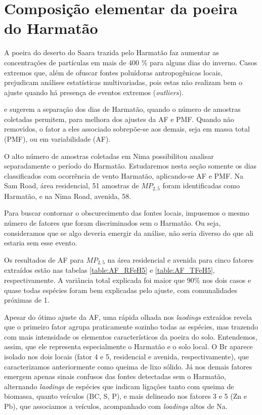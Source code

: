 \newpage
\section{Composição elementar da poeira do Harmatão}

A poeira do deserto do Saara trazida pelo Harmatão faz aumentar as concentrações
de partículas em mais de 400 \% para alguns dias do inverno. Casos extremos 
que, além de ofuscar fontes poluídoras antropogênicas locais, prejudicam 
análises estatísticas multivariadas, pois estas não realizam bem o ajuste 
quando há presença de eventos extremos (\textit{outliers}).

\citet{aboh2009} e \citet{ofosu2013} sugerem a separação dos dias de Harmatão, 
quando o número de amostras coletadas permitem, para melhora dos ajustes da AF e PMF. 
Quando não removidos, o fator a eles associado sobrepõe-se aos demais, seja em 
massa total (PMF), ou em variabilidade (AF).

O alto número de amostras coletadas em Nima possibilitou analisar separadamente 
o período do Harmatão. Estudaremos nesta seção somente os dias classificados 
com ocorrência de vento Harmatão, aplicando-se AF e PMF. 
Na Sam Road, área residencial, 51 amostras de $MP_{2,5}$ foram identificadas 
como Harmatão, e na Nima Road, avenida, 58. 

Para buscar contornar o obscurecimento das fontes locais, impusemos o mesmo 
número de fatores que foram discriminados sem o Harmatão. Ou seja, consideramos 
que se algo deveria emergir da análise, não seria diverso do que ali estaria sem
esse evento.

Os resultados de AF para $MP_{2,5}$ na área residencial e avenida para cinco 
fatores extraídos estão nas tabelas \ref{table:AF_RFeH5} e \ref{table:AF_TFeH5},
respectivamente.  A variância total explicada foi maior que 90\% nos dois  
casos e quase todas espécies foram bem explicadas pelo ajuste, com comunalidades 
próximas de 1. 

Apesar do ótimo ajuste da AF, uma rápida olhada nos \textit{laodings} extraídos
revela que o primeiro fator agrupa praticamente sozinho todas as espécies, 
mas trazendo com mais intensidade os elementos característicos da poeira do solo.
Entendemos, assim, que ele representa especialmente o Harmatão e o solo local. 
O Br aparece isolado nos dois locais (fator 4 e 5, residencial e avenida, 
respectivamente), que caracterizamos anteriormente como queima de lixo sólido. 
Já nos demais fatores emergem apenas sinais confusos das fontes detectadas sem 
o Harmatão, alternando \textit{laodings} de espécies que indicam ligações tanto 
com queima de biomassa, quanto veículos (BC, S, P), e mais delineado nos 
fatores 3 e 5 (Zn e Pb), que associamos a veículos, acompanhado com 
\textit{loadings} altos de Na.

